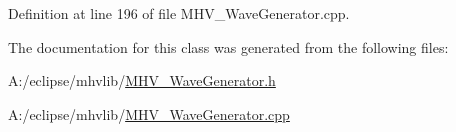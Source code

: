Definition at line 196 of file M\-H\-V\-\_\-\-Wave\-Generator.\-cpp.



The documentation for this class was generated from the following files\-:\begin{DoxyCompactItemize}
\item 
A\-:/eclipse/mhvlib/\hyperlink{_m_h_v___wave_generator_8h}{M\-H\-V\-\_\-\-Wave\-Generator.\-h}\item 
A\-:/eclipse/mhvlib/\hyperlink{_m_h_v___wave_generator_8cpp}{M\-H\-V\-\_\-\-Wave\-Generator.\-cpp}\end{DoxyCompactItemize}
